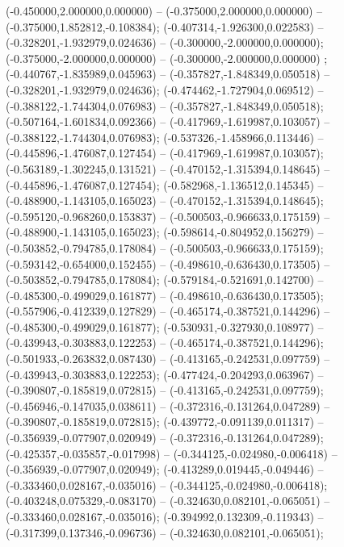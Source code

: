  (-0.450000,2.000000,0.000000) -- (-0.375000,2.000000,0.000000) -- (-0.375000,1.852812,-0.108384);
 (-0.407314,-1.926300,0.022583) -- (-0.328201,-1.932979,0.024636) -- (-0.300000,-2.000000,0.000000);
 (-0.375000,-2.000000,0.000000) -- (-0.300000,-2.000000,0.000000) ;
 (-0.440767,-1.835989,0.045963) -- (-0.357827,-1.848349,0.050518) -- (-0.328201,-1.932979,0.024636);
 (-0.474462,-1.727904,0.069512) -- (-0.388122,-1.744304,0.076983) -- (-0.357827,-1.848349,0.050518);
 (-0.507164,-1.601834,0.092366) -- (-0.417969,-1.619987,0.103057) -- (-0.388122,-1.744304,0.076983);
 (-0.537326,-1.458966,0.113446) -- (-0.445896,-1.476087,0.127454) -- (-0.417969,-1.619987,0.103057);
 (-0.563189,-1.302245,0.131521) -- (-0.470152,-1.315394,0.148645) -- (-0.445896,-1.476087,0.127454);
 (-0.582968,-1.136512,0.145345) -- (-0.488900,-1.143105,0.165023) -- (-0.470152,-1.315394,0.148645);
 (-0.595120,-0.968260,0.153837) -- (-0.500503,-0.966633,0.175159) -- (-0.488900,-1.143105,0.165023);
 (-0.598614,-0.804952,0.156279) -- (-0.503852,-0.794785,0.178084) -- (-0.500503,-0.966633,0.175159);
 (-0.593142,-0.654000,0.152455) -- (-0.498610,-0.636430,0.173505) -- (-0.503852,-0.794785,0.178084);
 (-0.579184,-0.521691,0.142700) -- (-0.485300,-0.499029,0.161877) -- (-0.498610,-0.636430,0.173505);
 (-0.557906,-0.412339,0.127829) -- (-0.465174,-0.387521,0.144296) -- (-0.485300,-0.499029,0.161877);
 (-0.530931,-0.327930,0.108977) -- (-0.439943,-0.303883,0.122253) -- (-0.465174,-0.387521,0.144296);
 (-0.501933,-0.263832,0.087430) -- (-0.413165,-0.242531,0.097759) -- (-0.439943,-0.303883,0.122253);
 (-0.477424,-0.204293,0.063967) -- (-0.390807,-0.185819,0.072815) -- (-0.413165,-0.242531,0.097759);
 (-0.456946,-0.147035,0.038611) -- (-0.372316,-0.131264,0.047289) -- (-0.390807,-0.185819,0.072815);
 (-0.439772,-0.091139,0.011317) -- (-0.356939,-0.077907,0.020949) -- (-0.372316,-0.131264,0.047289);
 (-0.425357,-0.035857,-0.017998) -- (-0.344125,-0.024980,-0.006418) -- (-0.356939,-0.077907,0.020949);
 (-0.413289,0.019445,-0.049446) -- (-0.333460,0.028167,-0.035016) -- (-0.344125,-0.024980,-0.006418);
 (-0.403248,0.075329,-0.083170) -- (-0.324630,0.082101,-0.065051) -- (-0.333460,0.028167,-0.035016);
 (-0.394992,0.132309,-0.119343) -- (-0.317399,0.137346,-0.096736) -- (-0.324630,0.082101,-0.065051);
